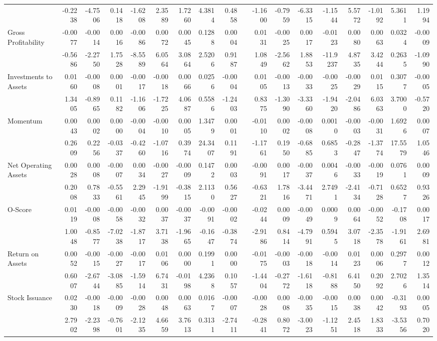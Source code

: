 \begin{table}[h]
{\begin{tabular}{lrrrrrrrrrrrrrrrrr}
& -0.2238 & -4.7506 & 0.1418 & -1.6208 & 2.3589 & 1.7260 & 4.3814 & 0.4858 &       & -1.1600 & -0.7959 & -6.3315 & -1.1544 & 5.5772 & -1.0192 & 5.3611 & 1.1994 \\
Gross Profitability & -0.0077 & -0.0014 & 0.0016 & -0.0086 & 0.0072 & 0.0045 & 0.1288 & 0.0004 &       & 0.0131 & -0.0025 & 0.0017 & -0.0123 & 0.0080 & 0.0063 & 0.0324 & -0.0009 \\
& -0.5686 & -2.2750 & 1.7528 & -8.5589 & 6.0564 & 3.0864 & 2.5206 & 0.9187 &       & 1.0849 & -2.5662 & 1.8853 & -11.9237 & 4.8735 & 3.4244 & 0.2635 & -1.0990 \\
Investments to Assets & 0.0160 & -0.0008 & 0.0001 & -0.0017 & -0.0018 & 0.0066 & 0.0256 & -0.0004 &       & 0.0105 & -0.0013 & -0.0033 & -0.0025 & -0.0029 & 0.0115 & 0.3077 & -0.0005 \\
& 1.3405 & -0.8965 & 0.1182 & -1.1606 & -1.7225 & 4.0687 & 0.5586 & -1.2403 &       & 0.8375 & -1.3090 & -3.3360 & -1.9420 & -2.0486 & 6.0363 & 3.7000 & -0.5720 \\
Momentum & 0.0043 & 0.0002 & 0.0000 & -0.0004 & -0.0010 & 0.0005 & 1.3479 & 0.0001 &       & -0.0110 & 0.0002 & -0.0008 & 0.0010 & -0.0003 & -0.0031 & 1.6926 & 0.0007 \\
& 0.2609 & 0.2256 & -0.0337 & -0.4260 & -1.0716 & 0.3974 & 24.3407 & 0.1191 &       & -1.1761 & 0.1950 & -0.6885 & 0.6853 & -0.2847 & -1.3774 & 17.5579 & 1.0546 \\
Net Operating Assets & 0.0028 & 0.0008 & -0.0007 & 0.0034 & -0.0027 & -0.0009 & 0.1472 & 0.0003 &       & -0.0091 & 0.0017 & -0.0037 & 0.0046 & -0.0033 & -0.0019 & 0.0761 & 0.0009 \\
& 0.2008 & 0.7833 & -0.5561 & 2.2945 & -1.9199 & -0.3815 & 2.1130 & 0.5627 &       & -0.6321 & 1.7816 & -3.4471 & 2.7491 & -2.4134 & -0.7128 & 0.6527 & 0.9326 \\
O-Score & 0.0119 & -0.0008 & -0.0058 & -0.0032 & 0.0037 & -0.0037 & -0.0091 & -0.0002 &       & -0.0244 & 0.0009 & -0.0049 & 0.0009 & 0.0064 & -0.0052 & -0.1708 & 0.0017 \\
& 1.0048 & -0.8577 & -7.0238 & -1.8717 & 3.7138 & -1.9665 & -0.1647 & -0.3874 &       & -2.9186 & 0.8414 & -4.7991 & 0.5945 & 3.0718 & -2.3578 & -1.9161 & 2.6981 \\
Return on Assets & 0.0052 & -0.0015 & -0.0027 & -0.0017 & 0.0106 & 0.0000 & 0.1991 & 0.0000 &       & -0.0175 & -0.0003 & -0.0018 & -0.0014 & 0.0123 & 0.0006 & 0.2977 & 0.0012 \\
& 0.6007 & -2.6744 & -3.0885 & -1.5914 & 6.7431 & -0.0198 & 4.2368 & 0.1057 &       & -1.4404 & -0.2772 & -1.6118 & -0.8188 & 6.4150 & 0.2092 & 2.7026 & 1.3514 \\
Stock Issuance & 0.0230 & -0.0018 & -0.0009 & -0.0028 & 0.0048 & 0.0063 & 0.0167 & -0.0007 &       & -0.0028 & 0.0008 & -0.0035 & -0.0015 & 0.0038 & 0.0042 & -0.3193 & 0.0005 \\
& 2.7902 & -2.2398 & -0.7601 & -2.1235 & 4.6659 & 3.7613 & 0.3131 & -2.7411 &       & -0.2841 & 0.8072 & -3.0023 & -1.1251 & 2.4518 & 1.8333 & -3.5356 & 0.7020 \\
\bottomrule
\end{tabular}%
}
\label{tab:vol-ff6v}%
\end{table}%

